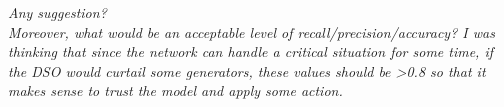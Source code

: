 \noindent \emph{Any suggestion? \\ Moreover, what would be an acceptable level of recall/precision/accuracy? I was thinking that since the network can handle a critical situation for some time, if the DSO would curtail some generators, these values should be >0.8 so that it makes sense to trust the model and apply some action.} \label{q:evaluation}

    



